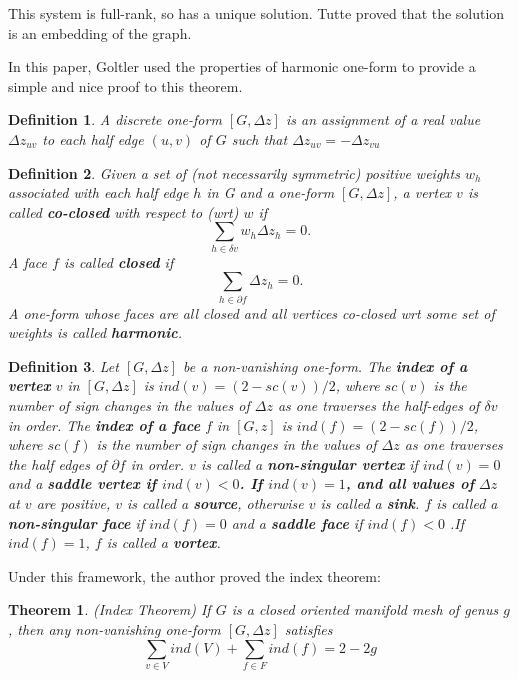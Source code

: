 \documentclass[fleqn,10pt]{wlscirep}
\newtheorem{definition}{Definition}[section]
\newtheorem{theorem}{Theorem}[section]
\begin{document}
This system is full-rank, so has a unique solution. Tutte proved that the solution is an embedding of the graph. 

In this paper, Goltler used the properties of harmonic one-form to provide a simple and nice proof to this theorem.

\begin{definition}
A discrete one-form $[G, \Delta z]$ is an assignment of a real value $\Delta z_{uv}$ to each half edge $(u,v)$ of $G$ such that $\Delta z_{uv} =-\Delta z_{vu}$
\end{definition}

\begin{definition}
Given a set of (not necessarily symmetric) positive weights $w_h$ associated with each half
edge $h$ in G and a one-form $[G,  \Delta z]$, a vertex $v$ is called \textbf{co-closed} with respect to (wrt) $w$ if
$$\sum_{h\in \delta v}w_h \Delta z_h =0.$$
A face $f$ is called \textbf{closed} if
 $$\sum_{h\in \partial f}\Delta z_h = 0. $$
 A one-form whose faces are all closed and all vertices co-closed wrt some set of weights is called \textbf{harmonic}.
\end{definition}

\begin{definition}
Let $[G,  \Delta z]$ be a non-vanishing one-form. The \textbf{index of a vertex} $v$ in $[G,  \Delta z]$ is $ind(v) = (2 - sc(v))/2$, where $sc(v)$ is the number of sign changes in the values of  $\Delta z$ as one traverses the half-edges of $\delta v$ in order. The \textbf{index of a face} $f$ in $[G, z]$ is $ind(f) = (2 - sc(f))/2$, where $sc(f)$ is the number of sign changes in the values of  $\Delta z$ as one traverses the half edges of $\partial f$ in order. $v$ is called a \textbf{non-singular vertex} if $ind(v) = 0$ and a \textbf{saddle vertex if $ind(v) < 0$. If $ind(v) = 1$, and all values of } $\Delta z$ at $v$ are positive, $v$ is called a \textbf{source}, otherwise $v$ is called a \textbf{sink}. $f$ is called a \textbf{non-singular face} if $ind(f)=0$ and a \textbf{saddle face} if $ind(f)<0$ .If $ind(f)=1$, $f$ is called a \textbf{vortex}.
\end{definition}


Under this framework, the author proved the index theorem:
\begin{theorem}(Index Theorem)
If $G$ is a closed oriented manifold mesh of genus $g$, then any non-vanishing one-form $[G,  \Delta z]$ satisfies 
$$ \sum_{v\in V} ind(V) + \sum_{f\in F} ind(f)= 2 - 2g$$

\end{theorem}
\end{document}

